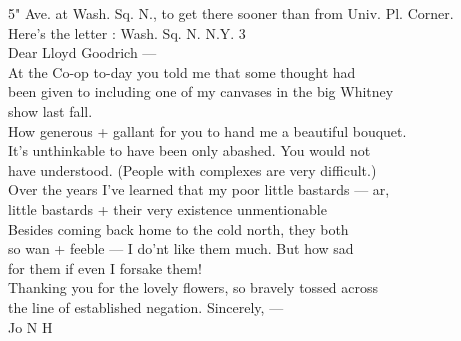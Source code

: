 \documentclass[11pt,a4paper]{article}
\begin{document}
{5" Ave. at Wash. Sq. N., to get there sooner than from Univ. Pl. Corner. \\
Here's the letter :  Wash. Sq. N. \quad N.Y. 3 \\
Dear Lloyd Goodrich --- \\
\quad At the Co-op to-day you told me that some thought had \\
been given to including one of my canvases in the big Whitney \\
show last fall. \\
\quad How generous + gallant for you to hand me a beautiful bouquet. \\
It's unthinkable to have been only abashed. You would not \\
have understood. (People with complexes are very difficult.) \\
Over the years I've learned that my poor little bastards --- ar, \\
little bastards + their very existence unmentionable \\
\quad Besides coming back home to the cold north, they both \\
so wan + feeble --- I do'nt like them much. But how sad \\
for them if even I forsake them! \\
\quad Thanking you for the lovely flowers, so bravely tossed across \\
the line of established negation. \qquad Sincerely, --- \\
\qquad \qquad \qquad Jo N H}




\end{document}
